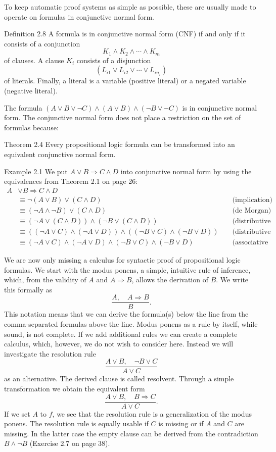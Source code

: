 \documentclass[10pt]{book}
\begin{document}
To keep automatic proof systems as simple as possible, these are usually made to operate on formulas in conjunctive normal form.

Definition 2.8 A formula is in conjunctive normal form (CNF) if and only if it consists of a conjunction
$$
K_{1} \wedge K_{2} \wedge \cdots \wedge K_{m}
$$
of clauses. A clause $K_{i}$ consists of a disjunction
$$
\left(L_{i 1} \vee L_{i 2} \vee \cdots \vee L_{i n_{i}}\right)
$$
of literals. Finally, a literal is a variable (positive literal) or a negated variable (negative literal).

The formula $(A \vee B \vee \neg C) \wedge(A \vee B) \wedge(\neg B \vee \neg C)$ is in conjunctive normal form. The conjunctive normal form does not place a restriction on the set of formulas because:

Theorem 2.4 Every propositional logic formula can be transformed into an equivalent conjunctive normal form.

Example 2.1 We put $A \vee B \Rightarrow C \wedge D$ into conjunctive normal form by using the equivalences from Theorem 2.1 on page 26:
$$
\begin{aligned}
A & \vee B \Rightarrow C \wedge D & & \\
& \equiv \neg(A \vee B) \vee(C \wedge D) & & \text { (implication) } \\
& \equiv(\neg A \wedge \neg B) \vee(C \wedge D) & & \text { (de Morgan) } \\
& \equiv(\neg A \vee(C \wedge D)) \wedge(\neg B \vee(C \wedge D)) & & \text { (distributive law) } \\
& \equiv((\neg A \vee C) \wedge(\neg A \vee D)) \wedge((\neg B \vee C) \wedge(\neg B \vee D)) & & \text { (distributive law) } \\
& \equiv(\neg A \vee C) \wedge(\neg A \vee D) \wedge(\neg B \vee C) \wedge(\neg B \vee D) & & \text { (associative law) }
\end{aligned}
$$

We are now only missing a calculus for syntactic proof of propositional logic formulas. We start with the modus ponens, a simple, intuitive rule of inference, which, from the validity of $A$ and $A \Rightarrow B$, allows the derivation of $B$. We write this formally as
$$
\frac{A, \quad A \Rightarrow B}{B} .
$$
This notation means that we can derive the formula(s) below the line from the comma-separated formulas above the line. Modus ponens as a rule by itself, while sound, is not complete. If we add additional rules we can create a complete calculus, which, however, we do not wish to consider here. Instead we will investigate the resolution rule
\begin{equation*}
\frac{A \vee B, \quad \neg B \vee C}{A \vee C} \tag{2.1}
\end{equation*}
as an alternative. The derived clause is called resolvent. Through a simple transformation we obtain the equivalent form
$$
\frac{A \vee B, \quad B \Rightarrow C}{A \vee C} .
$$
If we set $A$ to $f$, we see that the resolution rule is a generalization of the modus ponens. The resolution rule is equally usable if $C$ is missing or if $A$ and $C$ are missing. In the latter case the empty clause can be derived from the contradiction $B \wedge \neg B$ (Exercise 2.7 on page 38).
\end{document}
